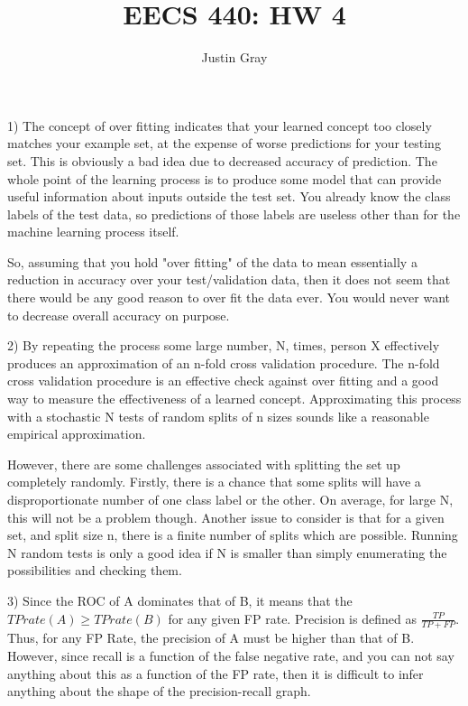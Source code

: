 \documentclass[12pt]{article}
\title{EECS 440: HW 4}
\author{Justin Gray}
\begin{document}
\maketitle
\setcounter{equation}{0}
1) The concept of over fitting indicates that your learned concept too closely 
matches your example set, at the expense of worse predictions for your testing set. 
This is obviously a bad idea due to decreased accuracy of prediction. The whole point 
of the learning process is to produce some model that can provide useful information 
about inputs outside the test set. You already know the class labels of the test data, 
so predictions of those labels are useless other than for the machine learning process 
itself. 

So, assuming that you hold "over fitting" of the data to mean essentially a reduction in 
accuracy over your test/validation data, then it does not seem that there would be any 
good reason to over fit the data ever. You would never want to decrease overall accuracy 
on purpose. 

2) By repeating the process some large number, N, times, person X effectively produces an
approximation of an n-fold cross validation procedure. The n-fold cross validation 
procedure is an effective check against over fitting and a good way to measure the effectiveness 
of a learned concept. Approximating this process with a stochastic N tests of random splits of n 
sizes sounds like a reasonable empirical approximation. 

However, there are some challenges associated with splitting the set up completely randomly. 
Firstly, there is a chance that some splits will have a disproportionate number of one class
label or the other. On average, for large N, this will not be a problem though. Another issue 
to consider is that for a given set, and split size n, there is a finite number of splits which are possible. 
Running N random tests is only a good idea if N is smaller than simply enumerating the possibilities and checking them. 

3) Since the ROC of A dominates that of B, it means that the $TP rate(A) \geq TP rate(B)$
for any given FP rate. Precision is defined as $\frac{TP}{TP+FP}$. Thus, 
for any FP Rate, the precision of A must be higher than that of B. However, since 
recall is a function of the false negative rate, and you can not say anything about this 
as a function of the FP rate, then it is difficult to infer anything about the shape of the
precision-recall graph. 
\end{document}
